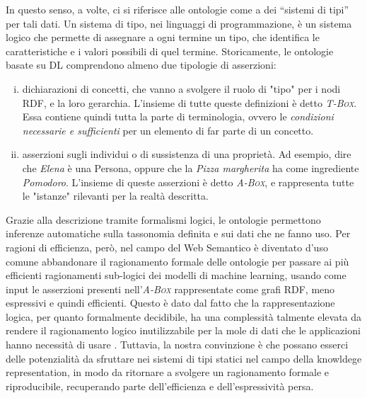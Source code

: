 In questo senso, a volte, ci si riferisce alle ontologie come a dei “sistemi di tipi” per tali dati. Un sistema di tipo, nei linguaggi di programmazione, 
è un sistema logico che permette di assegnare a ogni termine un tipo, che identifica le caratteristiche e i valori possibili di quel termine. Storicamente, 
le ontologie basate su DL comprendono almeno due tipologie di asserzioni:
\begin{enumerate}[i)]
	\item dichiarazioni di concetti, che vanno a svolgere il ruolo di "tipo" per i nodi RDF, e la loro gerarchia. L'insieme di tutte queste definizioni 
    è detto \textsc{\itshape T-Box}. Essa contiene quindi tutta la parte di terminologia, ovvero le \textit{condizioni necessarie e sufficienti} per un 
    elemento di far parte di un concetto.
	\item asserzioni sugli individui o di sussistenza di una proprietà. Ad esempio, dire che \textsl{Elena} è una Persona, oppure che la 
    \textsl{ Pizza margherita} ha come ingrediente \textsl{Pomodoro}. L'insieme di queste asserzioni è detto \textsc{\itshape A-Box}, e rappresenta 
    tutte le "istanze" rilevanti per la realtà descritta.
\end{enumerate}
Grazie alla descrizione tramite formalismi logici, le ontologie permettono inferenze automatiche sulla tassonomia definita e sui dati che ne fanno uso. 
Per ragioni di efficienza, però, nel campo del Web Semantico è diventato d'uso comune abbandonare il ragionamento formale delle ontologie per passare ai 
più efficienti ragionamenti sub-logici dei modelli di machine learning, usando come input le asserzioni presenti nell'\textsc{\itshape A-Box} rappresentate 
come grafi RDF, meno espressivi e quindi efficienti. Questo è dato dal fatto che la rappresentazione logica, per quanto formalmente decidibile, ha una 
complessità talmente elevata da rendere il ragionamento logico inutilizzabile per la mole di dati che le applicazioni hanno necessità di usare 
\cite{baader2017introductionDL}. Tuttavia, la nostra convinzione è che possano esserci delle potenzialità da sfruttare nei sistemi di tipi statici nel 
campo della knowldege representation, in modo da ritornare a svolgere un ragionamento formale e riproducibile, recuperando parte dell'efficienza e 
dell'espressività persa.